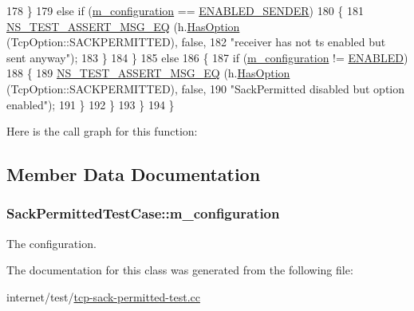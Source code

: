 \begin{DoxyCode}
178             \}
179           \textcolor{keywordflow}{else} \textcolor{keywordflow}{if} (\hyperlink{classSackPermittedTestCase_aff7ae43e44e4fb3f7286e9d3083f2732}{m\_configuration} == \hyperlink{classSackPermittedTestCase_a2dc95ae5e965bc36df7ea84c64723493aef344cc4eec6eedc3e644b86edc4db95}{ENABLED\_SENDER})
180             \{
181               \hyperlink{group__testing_ga2a9d78cffb3db8e867c35fff0b698cf5}{NS\_TEST\_ASSERT\_MSG\_EQ} (h.\hyperlink{classns3_1_1TcpHeader_aacc07bdab91925f1cddf9bcb1ae91d13}{HasOption} (TcpOption::SACKPERMITTED), \textcolor{keyword}{
      false},
182                                      \textcolor{stringliteral}{"receiver has not ts enabled but sent anyway"});
183             \}
184         \}
185       \textcolor{keywordflow}{else}
186         \{
187           \textcolor{keywordflow}{if} (\hyperlink{classSackPermittedTestCase_aff7ae43e44e4fb3f7286e9d3083f2732}{m\_configuration} != \hyperlink{classSackPermittedTestCase_a2dc95ae5e965bc36df7ea84c64723493a895f2f11241beaf1334839f4056a0531}{ENABLED})
188             \{
189               \hyperlink{group__testing_ga2a9d78cffb3db8e867c35fff0b698cf5}{NS\_TEST\_ASSERT\_MSG\_EQ} (h.\hyperlink{classns3_1_1TcpHeader_aacc07bdab91925f1cddf9bcb1ae91d13}{HasOption} (TcpOption::SACKPERMITTED), \textcolor{keyword}{
      false},
190                                      \textcolor{stringliteral}{"SackPermitted disabled but option enabled"});
191             \}
192         \}
193     \}
194 \}
\end{DoxyCode}


Here is the call graph for this function\+:




\subsection{Member Data Documentation}
\subsubsection[{\texorpdfstring{m\+\_\+configuration}{m_configuration}}]{ Sack\+Permitted\+Test\+Case\+::m\+\_\+configuration\hspace{0.3cm}{\ttfamily [protected]}}\hypertarget{classSackPermittedTestCase_aff7ae43e44e4fb3f7286e9d3083f2732}{}\label{classSackPermittedTestCase_aff7ae43e44e4fb3f7286e9d3083f2732}


The configuration. 



The documentation for this class was generated from the following file\+:\begin{DoxyCompactItemize}
\item 
internet/test/\hyperlink{tcp-sack-permitted-test_8cc}{tcp-\/sack-\/permitted-\/test.\+cc}\end{DoxyCompactItemize}
